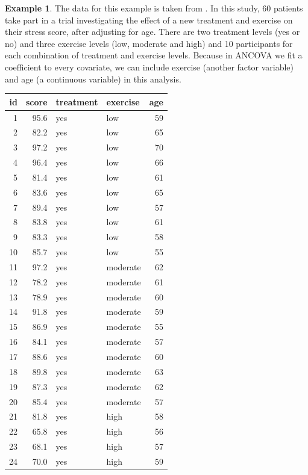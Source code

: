 \documentclass[
  openany]{book}
\theoremstyle{definition}
\theoremstyle{definition}
\newtheorem{example}{Example}[chapter]
\theoremstyle{definition}
\theoremstyle{definition}
\theoremstyle{remark}
\begin{document}
\begin{example}
The data for this example is taken from \citet{datarium}. In this study, 60 patients take part in a trial investigating the effect of a new treatment and exercise on their stress score, after adjusting for age.
There are two treatment levels (yes or no) and three exercise levels (low, moderate and high) and 10 participants for each combination of treatment and exercise levels. Because in ANCOVA we fit a coefficient to every covariate, we can include exercise (another factor variable) and age (a continuous variable) in this analysis.

\begin{tabular}{r|r|l|l|r}
\hline
id & score & treatment & exercise & age\\
\hline
1 & 95.6 & yes & low & 59\\
\hline
2 & 82.2 & yes & low & 65\\
\hline
3 & 97.2 & yes & low & 70\\
\hline
4 & 96.4 & yes & low & 66\\
\hline
5 & 81.4 & yes & low & 61\\
\hline
6 & 83.6 & yes & low & 65\\
\hline
7 & 89.4 & yes & low & 57\\
\hline
8 & 83.8 & yes & low & 61\\
\hline
9 & 83.3 & yes & low & 58\\
\hline
10 & 85.7 & yes & low & 55\\
\hline
11 & 97.2 & yes & moderate & 62\\
\hline
12 & 78.2 & yes & moderate & 61\\
\hline
13 & 78.9 & yes & moderate & 60\\
\hline
14 & 91.8 & yes & moderate & 59\\
\hline
15 & 86.9 & yes & moderate & 55\\
\hline
16 & 84.1 & yes & moderate & 57\\
\hline
17 & 88.6 & yes & moderate & 60\\
\hline
18 & 89.8 & yes & moderate & 63\\
\hline
19 & 87.3 & yes & moderate & 62\\
\hline
20 & 85.4 & yes & moderate & 57\\
\hline
21 & 81.8 & yes & high & 58\\
\hline
22 & 65.8 & yes & high & 56\\
\hline
23 & 68.1 & yes & high & 57\\
\hline
24 & 70.0 & yes & high & 59\\

\end{tabular}
\end{example}
\end{document}
